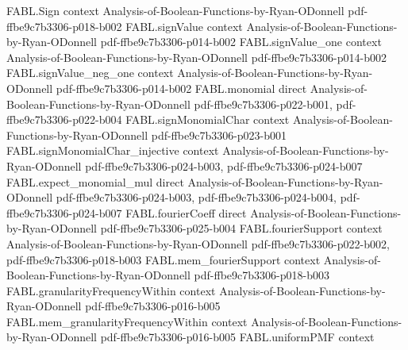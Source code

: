 \begin{theorem}
\label{FABL.normalizedCorrelatedPairSum_first_secondMoment}
\leanok
{}
\proofstep
  {FABL.Sign}
  {context}
  {Analysis-of-Boolean-Functions-by-Ryan-ODonnell}
  {pdf-ffbe9c7b3306-p018-b002}
\proofstep
  {FABL.signValue}
  {context}
  {Analysis-of-Boolean-Functions-by-Ryan-ODonnell}
  {pdf-ffbe9c7b3306-p014-b002}
\proofstep
  {FABL.signValue_one}
  {context}
  {Analysis-of-Boolean-Functions-by-Ryan-ODonnell}
  {pdf-ffbe9c7b3306-p014-b002}
\proofstep
  {FABL.signValue_neg_one}
  {context}
  {Analysis-of-Boolean-Functions-by-Ryan-ODonnell}
  {pdf-ffbe9c7b3306-p014-b002}
\proofstep
  {FABL.monomial}
  {direct}
  {Analysis-of-Boolean-Functions-by-Ryan-ODonnell}
  {pdf-ffbe9c7b3306-p022-b001,
    pdf-ffbe9c7b3306-p022-b004}
\proofstep
  {FABL.signMonomialChar}
  {context}
  {Analysis-of-Boolean-Functions-by-Ryan-ODonnell}
  {pdf-ffbe9c7b3306-p023-b001}
\proofstep
  {FABL.signMonomialChar_injective}
  {context}
  {Analysis-of-Boolean-Functions-by-Ryan-ODonnell}
  {pdf-ffbe9c7b3306-p024-b003,
    pdf-ffbe9c7b3306-p024-b007}
\proofstep
  {FABL.expect_monomial_mul}
  {direct}
  {Analysis-of-Boolean-Functions-by-Ryan-ODonnell}
  {pdf-ffbe9c7b3306-p024-b003,
    pdf-ffbe9c7b3306-p024-b004,
    pdf-ffbe9c7b3306-p024-b007}
\proofstep
  {FABL.fourierCoeff}
  {direct}
  {Analysis-of-Boolean-Functions-by-Ryan-ODonnell}
  {pdf-ffbe9c7b3306-p025-b004}
\proofstep
  {FABL.fourierSupport}
  {context}
  {Analysis-of-Boolean-Functions-by-Ryan-ODonnell}
  {pdf-ffbe9c7b3306-p022-b002,
    pdf-ffbe9c7b3306-p018-b003}
\proofstep
  {FABL.mem_fourierSupport}
  {context}
  {Analysis-of-Boolean-Functions-by-Ryan-ODonnell}
  {pdf-ffbe9c7b3306-p018-b003}
\proofstep
  {FABL.granularityFrequencyWithin}
  {context}
  {Analysis-of-Boolean-Functions-by-Ryan-ODonnell}
  {pdf-ffbe9c7b3306-p016-b005}
\proofstep
  {FABL.mem_granularityFrequencyWithin}
  {context}
  {Analysis-of-Boolean-Functions-by-Ryan-ODonnell}
  {pdf-ffbe9c7b3306-p016-b005}
\proofstep
  {FABL.uniformPMF}
  {context}

\end{theorem}
